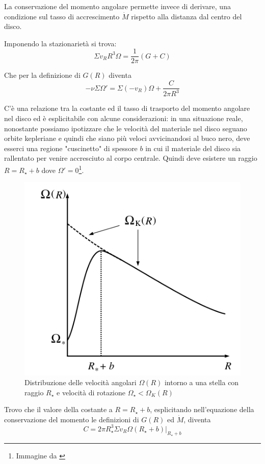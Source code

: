 \documentclass[a4paperbi]{article}
\begin{document}
	La conservazione del momento angolare permette invece di derivare, una condizione sul tasso di accrescimento $\dot{M}$ rispetto alla distanza dal centro del disco.
	
	Imponendo la stazionarietà si trova:
	\begin{equation}
		\Sigma v_RR^3\Omega=\frac{1}{2\pi}(G+C)
	\end{equation}
	
	Che per la definizione di $G(R)$ diventa
	\begin{equation}
		-\nu\Sigma\Omega'=\Sigma(-v_R)\Omega+\frac{C}{2\pi R^3}
	\end{equation}
	
	C'è una relazione tra la costante ed il tasso di trasporto del momento angolare nel disco ed è esplicitabile con alcune considerazioni: in una situazione reale, nonostante possiamo ipotizzare che le velocità del materiale nel disco seguano orbite kepleriane e quindi che siano più veloci avvicinandosi al buco nero, deve esserci una regione "cuscinetto" di spessore $b$ in cui il materiale del disco sia rallentato per venire accresciuto al corpo centrale. Quindi deve esistere un raggio $R=R_{\star}+b$ dove $\Omega'=0$\footnote{Immagine da \cite{FrankKingRaineAccretionPower}}.
	
	\begin{figure}[H]
		\centering
		\includegraphics[width=0.7\linewidth]{InnerRegionAngularVelocity}
		\caption{Distribuzione delle velocità angolari $\Omega(R)$ intorno a una stella con raggio $R_\star$ e velocità di rotazione $\Omega_{\star}<\Omega_K(R)$}
		\label{fig:InnerRegionAngularVelocity}
	\end{figure}

	Trovo che il valore della costante a $R=R_{\star}+b$, esplicitando nell'equazione della conservazione del momento le definizioni di $G(R)$ ed $\dot{M}$, diventa
	\begin{equation*}
		C=2\pi R_{\star}^3\Sigma v_R\Omega(R_{\star}+b)\vert_{R_{\star}+b}
	\end{equation*}
	
\end{document}
